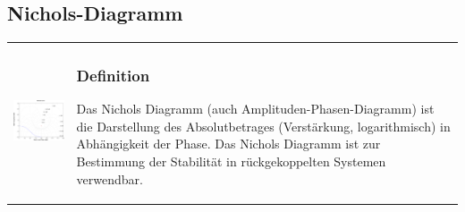\subsection{Nichols-Diagramm  }
\begin{tabular}{ll}
	\parbox{7cm}{
		\includegraphics[width=7cm]{./images/nichols.png}
	}
	& \parbox{11cm}{
		\subsubsection{Definition}
		Das Nichols Diagramm (auch Amplituden-Phasen-Diagramm) ist die Darstellung des
		Absolutbetrages (Verstärkung, logarithmisch) in Abhängigkeit der Phase. Das Nichols Diagramm ist zur
		Bestimmung der Stabilität in rückgekoppelten Systemen verwendbar.
	}
\end{tabular}

